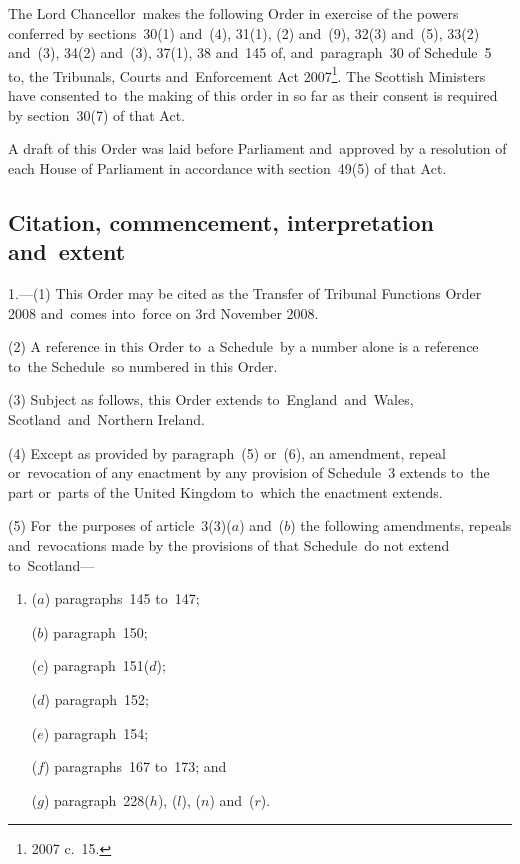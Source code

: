 \documentclass[12pt,a4paper]{article}
\title{\regstitle}
\author{S.I.\ 2008 No.\ 2833}
\date{Made
29th October 2008\\
Coming into~force
3rd November 2008
}
\begin{document}
\maketitle

\noindent
The Lord Chancellor~makes the following Order in exercise of the powers conferred by sections~30(1) and~(4), 31(1), (2) and~(9), 32(3) and~(5), 33(2) and~(3), 34(2) and~(3), 37(1), 38 and~145 of, and~paragraph~30 of Schedule~5 to, the Tribunals, Courts and~Enforcement Act 2007\footnote{2007 c.~15.}. The Scottish Ministers have consented to~the making of this order in so far as their consent is required by section~30(7) of that Act.

A draft of this Order was laid before Parliament and~approved by a resolution of each House of Parliament in accordance with section~49(5) of that Act. 

{\sloppy

\tableofcontents

}

\bigskip

\setcounter{secnumdepth}{-2}

\subsection[1. Citation, commencement, interpretation and~extent]{Citation, commencement, interpretation and~extent}

1.---(1)  This Order may be cited as the Transfer of Tribunal Functions Order 2008 and~comes into~force on 3rd November 2008.

(2) A reference in this Order to~a Schedule~by a number alone is a reference to~the Schedule~so numbered in this Order.

(3) Subject as follows, this Order extends to~England~and~Wales, Scotland~and~Northern Ireland.

(4) Except as provided by paragraph~(5) or~(6), an amendment, repeal or~revocation of any enactment by any provision of Schedule~3 extends to~the part or~parts of the United Kingdom to~which the enactment extends.

(5) For~the purposes of article~3(3)($a$)  and~($b$)  the following amendments, repeals and~revocations made by the provisions of that Schedule~do not extend to~Scotland—
\begin{enumerate}\item[]
($a$) paragraphs~145 to~147;

($b$) paragraph~150;

($c$) paragraph~151($d$);

($d$) paragraph~152;

($e$) paragraph~154;

($f$) paragraphs~167 to~173; and

($g$) paragraph~228($h$), ($l$), ($n$)  and~($r$).
\end{enumerate}
\end{document}
